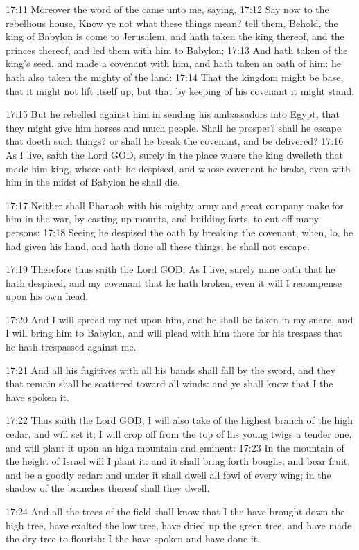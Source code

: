 17:11 Moreover the word of the \LORD came unto me, saying, 17:12 Say now to the rebellious house, Know ye not what these things mean?  tell them, Behold, the king of Babylon is come to Jerusalem, and hath taken the king thereof, and the princes thereof, and led them with him to Babylon; 17:13 And hath taken of the king's seed, and made a covenant with him, and hath taken an oath of him: he hath also taken the mighty of the land: 17:14 That the kingdom might be base, that it might not lift itself up, but that by keeping of his covenant it might stand.

17:15 But he rebelled against him in sending his ambassadors into Egypt, that they might give him horses and much people. Shall he prosper? shall he escape that doeth such things? or shall he break the covenant, and be delivered?  17:16 As I live, saith the Lord GOD, surely in the place where the king dwelleth that made him king, whose oath he despised, and whose covenant he brake, even with him in the midst of Babylon he shall die.

17:17 Neither shall Pharaoh with his mighty army and great company make for him in the war, by casting up mounts, and building forts, to cut off many persons: 17:18 Seeing he despised the oath by breaking the covenant, when, lo, he had given his hand, and hath done all these things, he shall not escape.

17:19 Therefore thus saith the Lord GOD; As I live, surely mine oath that he hath despised, and my covenant that he hath broken, even it will I recompense upon his own head.

17:20 And I will spread my net upon him, and he shall be taken in my snare, and I will bring him to Babylon, and will plead with him there for his trespass that he hath trespassed against me.

17:21 And all his fugitives with all his bands shall fall by the sword, and they that remain shall be scattered toward all winds: and ye shall know that I the \LORD have spoken it.

17:22 Thus saith the Lord GOD; I will also take of the highest branch of the high cedar, and will set it; I will crop off from the top of his young twigs a tender one, and will plant it upon an high mountain and eminent: 17:23 In the mountain of the height of Israel will I plant it: and it shall bring forth boughs, and bear fruit, and be a goodly cedar: and under it shall dwell all fowl of every wing; in the shadow of the branches thereof shall they dwell.

17:24 And all the trees of the field shall know that I the \LORD have brought down the high tree, have exalted the low tree, have dried up the green tree, and have made the dry tree to flourish: I the \LORD have spoken and have done it.

